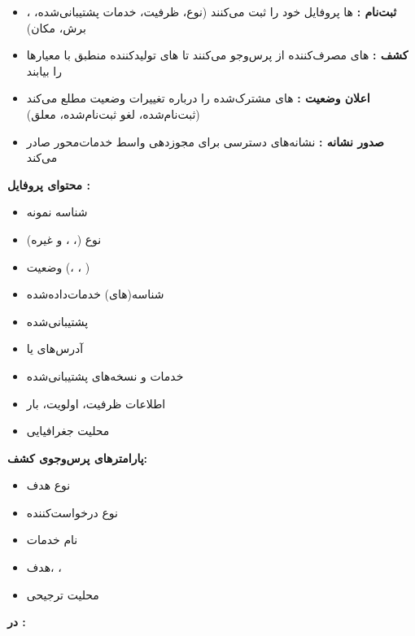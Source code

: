 \begin{itemize}
\tightlist
\item
  \textbf{ثبت‌نام :} ها پروفایل خود را ثبت می‌کنند (نوع، ظرفیت، خدمات پشتیبانی‌شده، ، برش، مکان)
\item
  \textbf{کشف :} های مصرف‌کننده از  پرس‌وجو می‌کنند تا های تولیدکننده منطبق با معیارها را بیابند
\item
  \textbf{اعلان وضعیت :} های مشترک‌شده را درباره تغییرات وضعیت  مطلع می‌کند (ثبت‌نام‌شده، لغو ثبت‌نام‌شده، معلق)
\item
  \textbf{صدور نشانه :} نشانه‌های دسترسی برای مجوزدهی واسط خدمات‌محور صادر می‌کند
\end{itemize}

\textbf{محتوای پروفایل :}

\begin{itemize}
\tightlist
\item
  شناسه نمونه 
\item
  نوع  (، ،  و غیره)
\item
  وضعیت  (، ، )
\item
  شناسه(های)  خدمات‌داده‌شده
\item
   پشتیبانی‌شده
\item
  آدرس‌های  یا 
\item
  خدمات و نسخه‌های پشتیبانی‌شده
\item
  اطلاعات ظرفیت، اولویت، بار
\item
  محلیت جغرافیایی
\end{itemize}

\textbf{پارامترهای پرس‌وجوی کشف:}

\begin{itemize}
\tightlist
\item
  نوع  هدف
\item
  نوع  درخواست‌کننده
\item
  نام خدمات
\item
   هدف، ، 
\item
  محلیت ترجیحی
\end{itemize}

\textbf{ در :}

